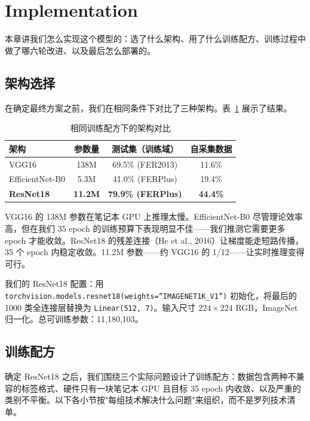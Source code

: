 \documentclass[12pt,a4paper]{ctexart}
\begin{document}
\section{Implementation}

本章讲我们怎么实现这个模型的：选了什么架构、用了什么训练配方、训练过程中做了哪六轮改进、以及最后怎么部署的。

\subsection{架构选择}

在确定最终方案之前，我们在相同条件下对比了三种架构。表~\ref{tab:arch_compare} 展示了结果。

\begin{table}[H]
\centering
\caption{相同训练配方下的架构对比}
\label{tab:arch_compare}
\begin{tabular}{lccc}
\toprule
架构 & 参数量 & 测试集（训练域） & 自采集数据 \\
\midrule
VGG16       & 138M  & 69.5\% (FER2013)  & 11.6\% \\
EfficientNet-B0 & 5.3M & 41.0\% (FERPlus)  & 19.4\% \\
\textbf{ResNet18} & \textbf{11.2M} & \textbf{79.9\% (FERPlus)} & \textbf{44.4\%} \\
\bottomrule
\end{tabular}
\end{table}

VGG16 的 138M 参数在笔记本 GPU 上推理太慢。EfficientNet-B0 尽管理论效率高，但在我们 35 epoch 的训练预算下表现明显不佳——我们推测它需要更多 epoch 才能收敛。ResNet18 的残差连接（He et al., 2016）让梯度能走短路传播，35 个 epoch 内稳定收敛。11.2M 参数——约 VGG16 的 1/12——让实时推理变得可行。

我们的 ResNet18 配置：用 \texttt{torchvision.models.resnet18(weights=``IMAGENET1K\_V1'')} 初始化，将最后的 1000 类全连接层替换为 \texttt{Linear(512, 7)}。输入尺寸 $224\times224$ RGB，ImageNet 归一化。总可训练参数：11,180,103。

\subsection{训练配方}

确定 ResNet18 之后，我们围绕三个实际问题设计了训练配方：数据包含两种不兼容的标签格式、硬件只有一块笔记本 GPU 且目标 35 epoch 内收敛、以及严重的类别不平衡。以下各小节按"每组技术解决什么问题"来组织，而不是罗列技术清单。
\end{document}
